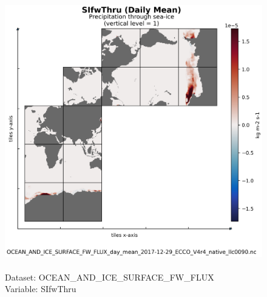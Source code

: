 \begin{figure}[H]
\centering
\includegraphics[scale=0.5]{../images/plots/native_plots/Ocean_and_Sea-Ice_Surface_Freshwater_Fluxes/SIfwThru.png}
\caption{\\Dataset: OCEAN\_AND\_ICE\_SURFACE\_FW\_FLUX\\Variable: SIfwThru}
\label{tab:table-OCEAN_AND_ICE_SURFACE_FW_FLUX_SIfwThru-Plot}
\end{figure}
\pagebreak
